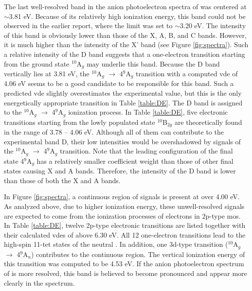 \begin{refsection}
The last well-resolved band in the anion photoelectron spectra of  was centered at $\sim$3.81 eV. Because of its relatively high ionization energy, this band could not be observed in the earlier report, where the limit was set to $\sim$3.20 eV. \cite{Tono2003B} The intensity of this band is obviously lower than those of the X, A, B, and C bands. However, it is much higher than the intensity of the X' band (see Figure \ref{fig:spectra}). Such a relative intensity of the D band suggests that a one-electron transition starting from the ground state $^{10}$A$_g$ may underlie this band. Because the D band vertically lies at 3.81 eV, the $^{10}$A$_g$ $\longrightarrow$ 4$^9$A$_g$ transition with a computed \acrshort{vde} of 4.06 eV seems to be a good candidate to be responsible for this band. Such a predicted \acrshort{vde} slightly overestimates the experimental value, but this is the only energetically appropriate transition in Table \ref{table:DE}. The D band is assigned to the $^{10}$A$_g$ $\longrightarrow$ 4$^9$A$_g$ ionization process. In Table \ref{table:DE}, five electronic transitions starting from the lowly populated state $^{10}$B$_{2g}$ are theoretically found in the range of 3.78 -- 4.06 eV. Although all of them can contribute to the experimental band D, their low intensities would be overshadowed by signals of the $^{10}$A$_g$ $\longrightarrow$ 4$^9$A$_g$ transition. Note that the leading configuration of the final state 4$^9$A$_g$ has a relatively smaller coefficient weight than those of other final states causing X and A bands. Therefore, the intensity of the D band is lower than those of both the X and A bands.  
  

In Figure \ref{fig:spectra}, a continuous region of signals is present at over 4.00 eV. As analyzed above, due to higher ionization energy, these unwell-resolved signals are expected to come from the ionization processes of electrons in 2p-type \acrshort{mo}s. In Table \ref{table:DE}, twelve 2p-type electronic transitions are listed together with their calculated \acrshort{vde}s of above 6.30 eV. All 12 one-electron transitions lead to the high-spin 11-tet states of the neutral . In addition, one 3d-type transition ($^{10}$A$_g$ $\longrightarrow$ 4$^9$A$_u$) contributes to the continuous region. The vertical ionization energy of this transition was computed to be 4.53 eV. If the anion photoelectron spectrum of  is more resolved, this band is believed to become pronounced and appear more clearly in the spectrum.


\end{refsection}
